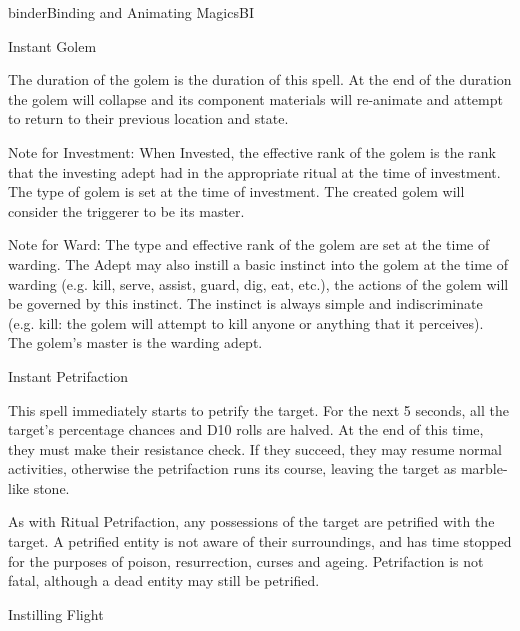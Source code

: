 \begin{College}[1.2]{binder}{Binding and Animating Magics}{BI}
\begin{spell}[S-4]{Instant Golem}
\begin{effects}
The duration of the golem is the duration of this spell.  At the end
of the duration the golem will collapse and its component materials
will re-animate and attempt to return to their previous location and
state.

Note for Investment: When Invested, the effective rank of the golem is
the rank that the investing adept had in the appropriate ritual at the
time of investment. The type of golem is set at the time of
investment.  The created golem will consider the triggerer to be its
master.

Note for Ward: The type and effective rank of the golem are set at the
time of warding.  The Adept may also instill a basic instinct into the
golem at the time of warding (e.g.  kill, serve, assist, guard, dig,
eat, etc.), the actions of the golem will be governed by this
instinct.  The instinct is always simple and indiscriminate
(e.g. kill: the golem will attempt to kill anyone or anything that it
perceives). The golem’s master is the warding adept.
\end{effects}
\end{spell}

\begin{spell}[S-5]{Instant Petrifaction}
\begin{effects}
This spell immediately starts to petrify the target.  For the next 5
seconds, all the target’s percentage chances and D10 rolls are halved.
At the end of this time, they must make their resistance check.  If
they succeed, they may resume normal activities, otherwise the
petrifaction runs its course, leaving the target as marble-like stone.

As with Ritual Petrifaction, any possessions of the target are
petrified with the target.  A petrified entity is not aware of their
surroundings, and has time stopped for the purposes of poison,
resurrection, curses and ageing.  Petrifaction is not fatal,
although a dead entity may still be petrified.
\end{effects}
\end{spell}

\begin{spell}[S-6]{Instilling Flight}


\end{spell}
\end{College}
